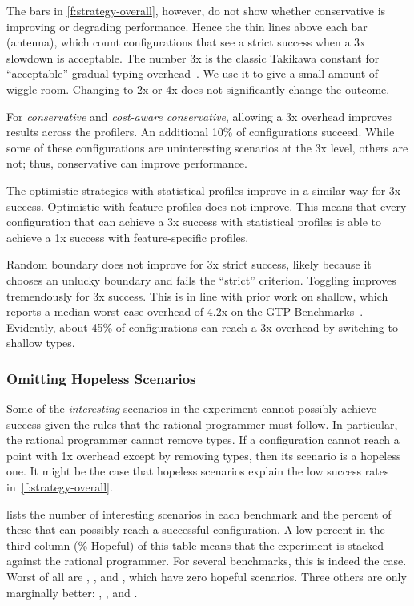 The bars in \cref{f:strategy-overall}, however, do not show whether conservative
is improving or degrading performance.
Hence the thin lines above each bar (antenna), which count configurations that see
a strict success when a 3x slowdown is acceptable.
The number 3x is the classic Takikawa constant for ``acceptable'' gradual typing
overhead~\cite{tfgnvf-popl-2016,vss-popl-2017,bbst-oopsla-2017}.
We use it to give a small amount of wiggle room.
Changing to 2x or 4x does not significantly change the outcome.

For \emph{conservative} and \emph{cost-aware conservative}, allowing a 3x overhead
improves results across the profilers.
An additional 10\% of configurations succeed.
While some of these configurations are uninteresting scenarios at the 3x level,
others are not; thus, conservative can improve performance.

The optimistic strategies with statistical profiles improve in a similar way
for 3x success.
Optimistic with feature profiles does not improve.
This means that every configuration that can achieve a 3x success with statistical
profiles is able to achieve a 1x success with feature-specific profiles.

Random boundary does not improve for 3x strict success, likely because it chooses
an unlucky boundary and fails the ``strict'' criterion.
Toggling improves tremendously for 3x success.
This is in line with prior work on shallow, which reports a median worst-case overhead
of 4.2x on the GTP Benchmarks~\cite{g-deep-shallow}.
Evidently, about 45\% of configurations can reach a 3x overhead by switching to
shallow types.


\subsubsection{Omitting Hopeless Scenarios}

Some of the \emph{interesting} scenarios in the experiment cannot possibly
achieve success given the rules that the rational programmer must follow.
In particular, the rational programmer cannot remove types.
If a configuration cannot reach a point with 1x overhead except by removing
types, then its scenario is a hopeless one.
It might be the case that hopeless scenarios explain the low success rates
in~\cref{f:strategy-overall}.

 lists the number of interesting scenarios in each benchmark
and the percent of these that can possibly reach a successful configuration.
A low percent in the third column (\% Hopeful) of this table means that
the experiment is stacked against the rational programmer.
For several benchmarks, this is indeed the case.
Worst of all are , , and ,
which have zero hopeful scenarios.
Three others are only marginally better: , , and
.

